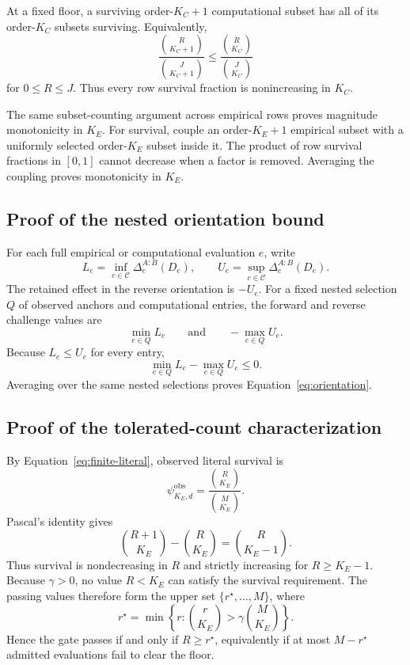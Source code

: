 \documentclass[11pt]{article}
\newcommand{\CSet}{\mathcal{C}}
\theoremstyle{remark}
\begin{document}
At a fixed floor, a surviving order-$K_C+1$ computational subset has all of
its order-$K_C$ subsets surviving. Equivalently,
\[
\frac{\binom{R}{K_C+1}}{\binom{J}{K_C+1}}
\leq
\frac{\binom{R}{K_C}}{\binom{J}{K_C}}
\]
for $0\leq R\leq J$. Thus every row survival fraction is nonincreasing in
$K_C$.

The same subset-counting argument across empirical rows proves magnitude
monotonicity in $K_E$. For survival, couple an order-$K_E+1$ empirical subset
with a uniformly selected order-$K_E$ subset inside it. The product of row
survival fractions in $[0,1]$ cannot decrease when a factor is removed.
Averaging the coupling proves monotonicity in $K_E$.

\subsection{Proof of the nested orientation bound}
\label{app:proof-orientation}

For each full empirical or computational evaluation $e$, write
\[
L_e=\inf_{c\in\CSet}\Delta_c^{A:B}(D_e),
\qquad
U_e=\sup_{c\in\CSet}\Delta_c^{A:B}(D_e).
\]
The retained effect in the reverse orientation is $-U_e$. For a fixed nested
selection $Q$ of observed anchors and computational entries, the forward and
reverse challenge values are
\[
\min_{e\in Q}L_e
\qquad\text{and}\qquad
-\max_{e\in Q}U_e.
\]
Because $L_e\leq U_e$ for every entry,
\[
\min_{e\in Q}L_e-\max_{e\in Q}U_e\leq0.
\]
Averaging over the same nested selections proves
Equation~\eqref{eq:orientation}.

\subsection{Proof of the tolerated-count characterization}
\label{app:proof-count}

By Equation~\eqref{eq:finite-literal}, observed literal survival is
\[
\psi^{\mathrm{obs}}_{K_E,d}
=
\frac{\binom{R}{K_E}}{\binom{M}{K_E}}.
\]
Pascal's identity gives
\[
\binom{R+1}{K_E}-\binom{R}{K_E}
=
\binom{R}{K_E-1}.
\]
Thus survival is nondecreasing in $R$ and strictly increasing for
$R\geq K_E-1$. Because $\gamma>0$, no value $R<K_E$ can satisfy the survival
requirement. The passing values therefore form the upper set
$\{r^\star,\ldots,M\}$, where
\[
r^\star
=
\min\left\{
r:\binom{r}{K_E}>\gamma\binom{M}{K_E}
\right\}.
\]
Hence the gate passes if and only if $R\geq r^\star$, equivalently if at most
$M-r^\star$ admitted evaluations fail to clear the floor.
\end{document}
